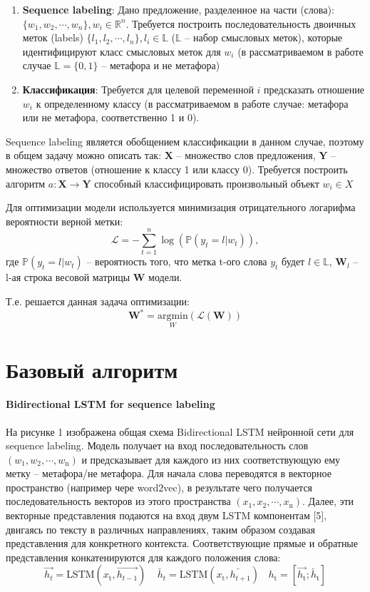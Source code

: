 \documentclass[12pt,twoside]{article}
\begin{document}
\begin{enumerate}
	\item \textbf{Sequence labeling}: Дано предложение, разделенное на части (слова): $\{w_1, w_2, \cdots, w_n\}, w_i\in\mathbb{R}^n$. Требуется построить последовательность двоичных меток (labels) $\{l_1, l_2, \cdots, l_n\}, l_i\in \mathbb{L}$ ($\mathbb{L}$ -- набор смысловых меток), которые идентифицируют класс смысловых меток для $w_i$ (в рассматриваемом в работе случае $\mathbb{L}=\{0, 1\}$ -- метафора и не метафора)
	
	\item \textbf{Классификация}: Требуется для целевой переменной $i$ предсказать отношение $w_i$ к определенному классу (в рассматриваемом в работе случае: метафора или не метафора, соответственно 1 и 0). 
\end{enumerate}

Sequence labeling является обобщением классификации в данном случае, поэтому в общем задачу можно описать так:
$\textbf{X}$ -- множество слов предложения, $\textbf{Y}$ -- множество ответов (отношение к классу 1 или классу 0). Требуется построить алгоритм $a: \textbf{X} \rightarrow \textbf{Y}$ способный классифицировать произвольный объект $w_i \in X$

Для оптимизации модели используется минимизация отрицательного логарифма вероятности верной метки: 
$$\mathcal{L} = -\sum_{t=1}^{n}\log(\mathbb{P}(y_t = l|w_t)),$$
где $\mathbb{P}(y_t = l| w_t)$ -- вероятность того, что метка t-ого слова $y_t$ будет $l\in \mathbb{L}$, $\textbf{W}_l$ -- l-ая строка весовой матрицы $\textbf{W}$ модели. 

Т.е. решается данная задача оптимизации: 
$$\textbf{W}^* = \underset{W}{\text{argmin}}(\mathcal{L}(\textbf{W}))$$

\section{Базовый алгоритм}

\paragraph{Bidirectional LSTM for sequence labeling}
На рисунке 1 изображена общая схема Bidirectional LSTM нейронной сети для sequence labeling. Модель получает на вход последовательность слов $(w_1, w_2, \cdots, w_\text{n})$ и предсказывает для каждого из них соответствующую ему метку – метафора/не метафора. Для начала слова  переводятся в векторное пространство (например чере word2vec), в результате чего получается последовательность векторов из этого пространства $(x_1, x_2, \cdots, x_\text{n})$. Далее, эти векторные представления подаются на вход двум LSTM компонентам [5], двигаясь по тексту в различных направлениях, таким образом создавая представления для конкретного контекста. Соответствующие прямые и обратные представления конкатенируются для каждого положения слова:
$$\overrightarrow{h_t} = \text{LSTM}(x_\text{t}, \overrightarrow{h_{t-1}})~~~~~
\overleftarrow{h_t} = \text{LSTM}(x_\text{t}, \overleftarrow{h_{t+1}})~~~~
h_\text{t} = [\overrightarrow{h_\text{t}};\overleftarrow{h_\text{t}}]$$
\end{document}
